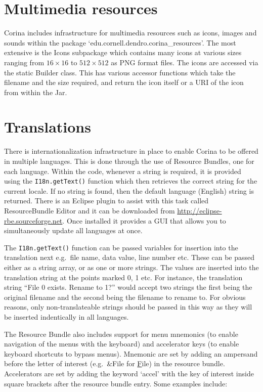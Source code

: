 \section{Multimedia resources}
Corina includes infrastructure for multimedia resources such as icons, images and sounds within the package `edu.cornell.dendro.corina\_resources'.  The most extensive is the Icons subpackage which contains many icons at various sizes ranging from $16\times16$ to $512\times512$ as PNG format files.  The icons are accessed via the static Builder class.  This has various accessor functions which take the filename and the size required, and return the icon itself or a URI of the icon from within the Jar.

\section{Translations}
There is internationalization infrastructure in place to enable Corina to be offered in multiple languages.  This is done through the use of Resource Bundles, one for each language.  Within the code, whenever a string is required, it is provided using the \verb|I18n.getText()| function which then retrieves the correct string for the current locale.  If no string is found, then the default language (English) string is returned.  There is an Eclipse plugin to assist with this task called ResourceBundle Editor and it can be downloaded from \url{http://eclipse-rbe.sourceforge.net}.  Once installed it provides a GUI that allows you to simultaneously update all languages at once.

The \verb|I18n.getText()| function can be passed variables for insertion into the translation next e.g.\ file name, data value, line number etc.  These can be passed either as a string array, or as one or more strings.  The values are inserted into the translation string at the points marked {0}, {1} etc.  For instance, the translation string ``File {0} exists.  Rename to {1}?'' would accept two strings the first being the original filename and the second being the filename to rename to.  For obvious reasons, only non-translateable strings should be passed in this way as they will be inserted indentically in all languages.

The Resource Bundle also includes support for menu mnemonics (to enable navigation of the menus with the keyboard) and accelerator keys (to enable keyboard shortcuts to bypass menus).  Mnemonic are set by adding an ampersand before the letter of interest (e.g.\ {\&}File for \underline{F}ile) in the resource bundle.  Accelerators are set by adding the keyword `accel' with the key of interest inside square brackets after the resource bundle entry.  Some examples include:

